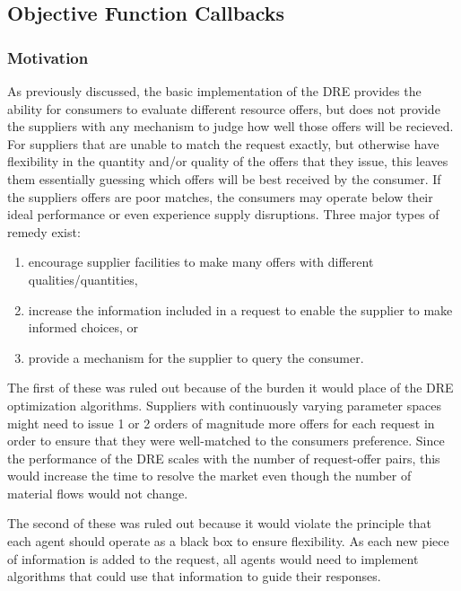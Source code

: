 \subsection{Objective Function Callbacks}\label{subsection:callback}

\subsubsection{Motivation}

As previously discussed, the basic implementation of the \gls{DRE} provides
the ability for consumers to evaluate different resource offers, but does not
provide the suppliers with any mechanism to judge how well those offers will
be recieved.  For suppliers that are unable to match the request exactly, but
otherwise have flexibility in the quantity and/or quality of the offers that
they issue, this leaves them essentially guessing which offers will be best
received by the consumer.  If the suppliers offers are poor matches, the
consumers may operate below their ideal performance or even experience supply
disruptions.  Three major types of remedy exist:
\begin{enumerate}
\item encourage supplier facilities to make many offers with different
  qualities/quantities,
\item increase the information included in a request to enable the supplier to
  make informed choices, or
\item provide a mechanism for the supplier to query the consumer.
\end{enumerate}

The first of these was ruled out because of the burden it would place of the
\gls{DRE} optimization algorithms.  Suppliers with continuously varying
parameter spaces might need to issue 1 or 2 orders of magnitude more offers for
each request in order to ensure that they were well-matched to the consumers
preference.  Since the performance of the \gls{DRE} scales with the number of
request-offer pairs, this would increase the time to resolve the market even
though the number of material flows would not change.

The second of these was ruled out because it would violate the
\Cyclus{} principle that each agent should operate as a black box to ensure
flexibility.  As each new piece of information is added to the request, all
agents would need to implement algorithms that could use that information to
guide their responses.  

